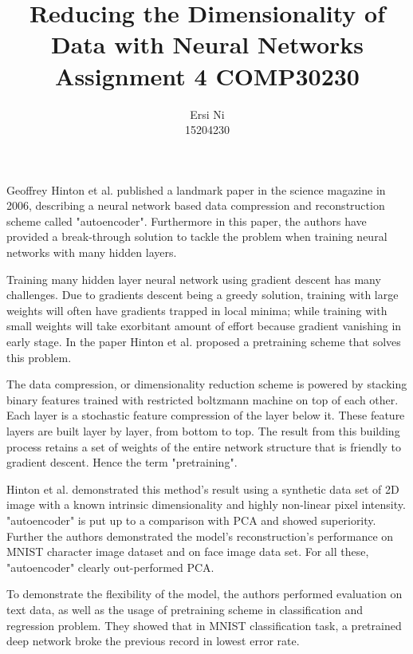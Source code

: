 \documentclass{scrartcl}
\title{Reducing the Dimensionality of Data with Neural Networks \\
 \large Assignment 4 COMP30230}
\author{Ersi Ni\\
\large 15204230}
\begin{document}
\maketitle

Geoffrey Hinton et al. published a landmark paper in the science magazine in 2006, describing a neural network based data compression and reconstruction scheme called "autoencoder". Furthermore in this paper, the authors have provided a break-through solution to tackle the problem when training neural networks with many hidden layers. 

Training many hidden layer neural network using gradient descent has many challenges. Due to gradients descent being a greedy solution, training with large weights will often have gradients trapped in local minima; while training with small weights will take exorbitant amount of effort because gradient vanishing in early stage. In the paper Hinton et al. proposed a pretraining scheme that solves this problem. 

The data compression, or dimensionality reduction scheme is powered by stacking binary features trained with restricted boltzmann machine on top of each other. Each layer is a stochastic feature compression of the layer below it. These feature layers are built layer by layer, from bottom to top. The result from this building process retains a set of weights of the entire network structure that is friendly to gradient descent. Hence the term "pretraining". 

Hinton et al. demonstrated this method's result using a synthetic data set of 2D image with a known intrinsic dimensionality and highly non-linear pixel intensity. "autoencoder" is put up to a comparison with PCA and showed superiority. Further the authors demonstrated the model's reconstruction's performance on MNIST character image dataset and on face image data set. For all these, "autoencoder" clearly out-performed PCA.

To demonstrate the flexibility of the model, the authors performed evaluation on text data, as well as the usage of pretraining scheme in classification and regression problem. They showed that in MNIST classification task, a pretrained deep network broke the previous record in lowest error rate. 
\end{document}

